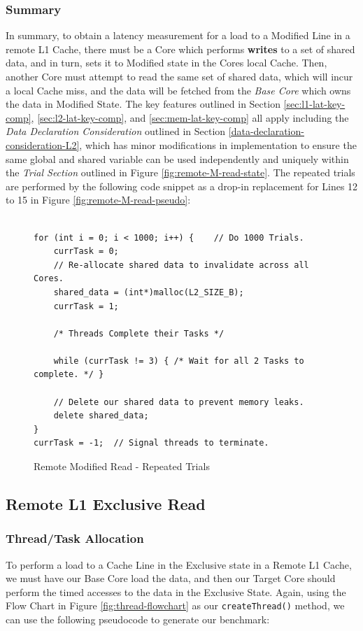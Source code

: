 \documentclass[bsc,frontabs,twoside,singlespacing,parskip,deptreport]{infthesis}     %
\begin{document}
\subsubsection{Summary}
In summary, to obtain a latency measurement for a load to a Modified Line in a remote L1 Cache, there must be a Core which performs \textbf{writes} to a set of shared data, and in turn, sets it to Modified state in the Cores local Cache. Then, another Core must attempt to read the same set of shared data, which will incur a local Cache miss, and the data will be fetched from the \emph{Base Core} which owns the data in Modified State. The key features outlined in Section \ref{sec:l1-lat-key-comp}, \ref{sec:l2-lat-key-comp}, and \ref{sec:mem-lat-key-comp} all apply including the \textit{Data Declaration Consideration} outlined in Section \ref{data-declaration-consideration-L2}, which has minor modifications in implementation to ensure the same global and shared variable can be used independently and uniquely within the \textit{Trial Section} outlined in Figure \ref{fig:remote-M-read-state}. The repeated trials are performed by the following code snippet as a drop-in replacement for Lines 12 to 15 in Figure \ref{fig:remote-M-read-pseudo}:
\begin{figure}[!h]
    \centering
    \begin{minipage}{0.8\textwidth}
    \begin{verbatim}

for (int i = 0; i < 1000; i++) {    // Do 1000 Trials.
    currTask = 0;
    // Re-allocate shared data to invalidate across all Cores.
    shared_data = (int*)malloc(L2_SIZE_B);
    currTask = 1;

    /* Threads Complete their Tasks */
        
    while (currTask != 3) { /* Wait for all 2 Tasks to complete. */ }
    
    // Delete our shared data to prevent memory leaks.
    delete shared_data;
}
currTask = -1;  // Signal threads to terminate.
    \end{verbatim}
    \end{minipage}
    \caption{Remote Modified Read - Repeated Trials}
    \label{fig:remote-M-repeat}
\end{figure}


\subsection{Remote L1 Exclusive Read}
\subsubsection{Thread/Task Allocation}
To perform a load to a Cache Line in the Exclusive state in a Remote L1 Cache, we must have our Base Core load the data, and then our Target Core should perform the timed accesses to the data in the Exclusive State. Again, using the Flow Chart in Figure \ref{fig:thread-flowchart} as our \texttt{createThread()} method, we can use the following pseudocode to generate our benchmark:
\end{document}
